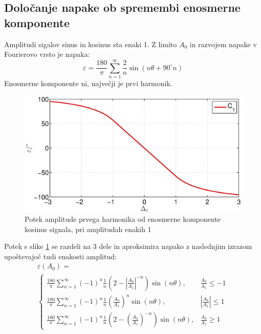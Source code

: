 \documentclass[a4paper]{article}
\begin{document}
\subsection{Določanje napake ob spremembi enosmerne komponente}
Amplitudi sigalov sinus in kosinus sta enaki 1.
Z limito $A_0$ in razvojem napake v Fourierovo vrsto je napaka:
\begin{equation}
\label{equ:off_lim_vrsta}
\varepsilon = \frac{180}{\pi}\sum_{n=1}^{\infty}\frac{2}{n} \sin (n \theta+ 90^\circ n)
\end{equation}
Enosmerne komponente ni,  največji je prvi harmonik.
\begin{figure}[!htb]
	\begin{center}
		\includegraphics[width=\linewidth]{./Slike/off.eps}
		\caption{Potek amplitude prvega harmonika od enosmerne komponente kosinus signala, pri amplitudah enakih 1} \label{fig:off}
	\end{center}
\end{figure}
Potek s slike \ref{fig:off} se razdeli na 3 dele in aproksimira napako z naslednjim izrazom upoštevajoč tudi enakosti amplitud:
\begin{multline}
\label{equ:offc_err}
\varepsilon(A_0)=\\
\begin{cases}
\frac{180}{\pi}\sum_{n=1}^{\infty}(-1)^n\frac{1}{n}(2-|\frac{A_0}{A_1}|^{-n}) \sin (n \theta ), & \frac{A_0}{A_1}\leq -1 \\
\frac{180}{\pi}\sum_{n=1}^{\infty}(-1)^n\frac{1}{n}(\frac{A_0}{A_1})^n \sin (n \theta ), & |\frac{A_0}{A_1}|\leq 1 \\
\frac{180}{\pi}\sum_{n=1}^{\infty}(-1)^n\frac{1}{n}(2-(\frac{A_0}{A_1})^{-n}) \sin (n \theta ), & \frac{A_0}{A_1}\geq 1
\end{cases}
\end{multline}
\end{document}
